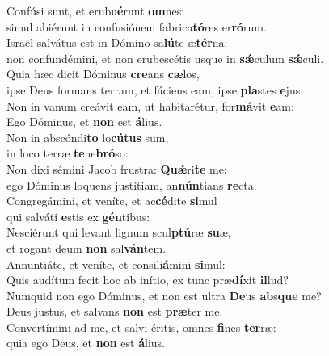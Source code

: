 \evenverse Confúsi sunt, et erubu\textbf{é}runt \textbf{om}nes:~\*\\
\evenverse simul abiérunt in confusiónem fabrica\textbf{tó}res er\textbf{ró}rum.\\
\oddverse Israël salvátus est in Dómino sa\textbf{lú}te æ\textbf{tér}na:~\*\\
\oddverse non confundémini, et non erubescétis usque in \textbf{sǽ}culum \textbf{sǽ}culi.\\
\evenverse Quia hæc dicit Dóminus \textbf{cre}ans \textbf{cæ}los,~\*\\
\evenverse ipse Deus formans terram, et fáciens eam, ipse \textbf{pla}stes \textbf{e}jus:\\
\oddverse Non in vanum creávit eam, ut habitarétur, for\textbf{má}vit \textbf{e}am:~\*\\
\oddverse Ego Dóminus, et \textbf{non} est \textbf{á}lius.\\
\evenverse Non in abscóndi\textbf{to} lo\textbf{cú}\textbf{tus} sum,~\*\\
\evenverse in loco terræ \textbf{te}ne\textbf{bró}so:\\
\oddverse Non dixi sémini Jacob frustra: \textbf{Quǽ}ri\textbf{te} me:~\*\\
\oddverse ego Dóminus loquens justítiam, an\textbf{nún}tians \textbf{re}cta.\\
\evenverse Congregámini, et veníte, et ac\textbf{cé}dite \textbf{si}mul~\*\\
\evenverse qui salváti \textbf{e}stis ex \textbf{gén}tibus:\\
\oddverse Nesciérunt qui levant lignum scul\textbf{ptú}ræ \textbf{su}æ,~\*\\
\oddverse et rogant deum \textbf{non} sal\textbf{ván}tem.\\
\evenverse Annuntiáte, et veníte, et consili\textbf{á}mini \textbf{si}mul:~\*\\
\evenverse Quis audítum fecit hoc ab inítio, ex tunc præ\textbf{dí}xit \textbf{il}lud?\\
\oddverse Numquid non ego Dóminus, et non est ultra \textbf{De}us \textbf{ab}s\textbf{que} me?~\*\\
\oddverse Deus justus, et salvans \textbf{non} est \textbf{præ}ter me.\\
\evenverse Convertímini ad me, et salvi éritis, omnes \textbf{fi}nes \textbf{ter}ræ:~\*\\
\evenverse quia ego Deus, et \textbf{non} est \textbf{á}lius.\\

